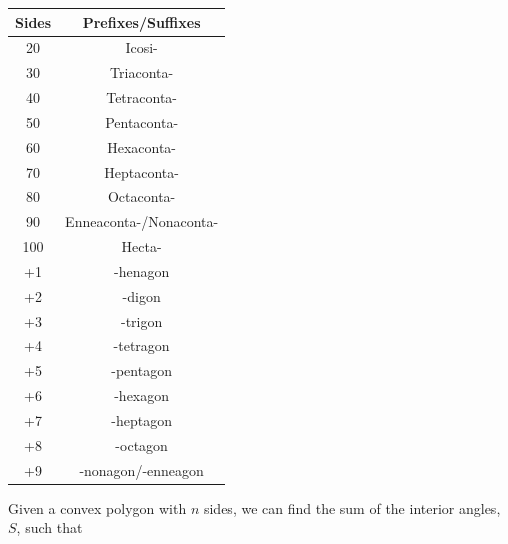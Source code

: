\documentclass{article}
\begin{document}
            \begin{center}
                \begin{tabular}{|c|c|}
                    \hline
                    \textbf{Sides} & \textbf{Prefixes/Suffixes} \\
                    \hline
                    20 & Icosi- \\
                    \hline
                    30 & Triaconta- \\
                    \hline
                    40 & Tetraconta- \\
                    \hline
                    50 & Pentaconta- \\
                    \hline
                    60 & Hexaconta- \\
                    \hline
                    70 & Heptaconta- \\
                    \hline
                    80 & Octaconta- \\
                    \hline
                    90 & Enneaconta-/Nonaconta- \\
                    \hline
                    100 & Hecta- \\
                    \hline
                    +1 & -henagon \\
                    \hline
                    +2 & -digon \\
                    \hline
                    +3 & -trigon \\
                    \hline
                    +4 & -tetragon \\
                    \hline
                    +5 & -pentagon \\
                    \hline
                    +6 & -hexagon \\
                    \hline
                    +7 & -heptagon \\
                    \hline
                    +8 & -octagon \\
                    \hline
                    +9 & -nonagon/-enneagon \\
                    \hline
                \end{tabular}
            \end{center}

            \noindent Given a convex polygon with $n$ sides, we can find the sum of the interior
            angles, $S$, such that \\
\end{document}
